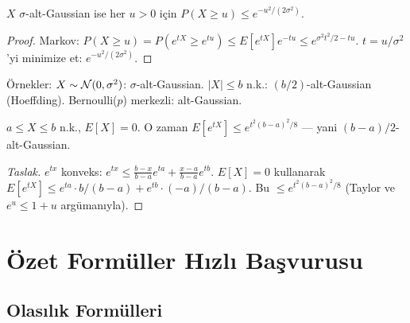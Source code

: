 \begin{teorem}\label{thm:alt_gaussian_kuyruk}
$X$ $\sigma$-alt-Gaussian ise her $u>0$ için $P(X\geq u)\leq e^{-u^2/(2\sigma^2)}$.
\end{teorem}
\begin{proof}
Markov: $P(X\geq u)=P(e^{tX}\geq e^{tu})\leq E[e^{tX}]e^{-tu}\leq e^{\sigma^2t^2/2-tu}$. $t=u/\sigma^2$'yi minimize et: $e^{-u^2/(2\sigma^2)}$.
\end{proof}

\noindent Örnekler: $X\sim\mathcal{N}(0,\sigma^2)$: $\sigma$-alt-Gaussian. $|X|\leq b$ n.k.: $(b/2)$-alt-Gaussian (Hoeffding). Bernoulli($p$) merkezli: alt-Gaussian.

\begin{teorem}\label{thm:hoeffding_lemma}
$a\leq X\leq b$ n.k., $E[X]=0$. O zaman $E[e^{tX}]\leq e^{t^2(b-a)^2/8}$ --- yani $(b-a)/2$-alt-Gaussian.
\end{teorem}
\begin{proof}[Taslak]
$e^{tx}$ konveks: $e^{tx}\leq \frac{b-x}{b-a}e^{ta}+\frac{x-a}{b-a}e^{tb}$.
$E[X]=0$ kullanarak $E[e^{tX}]\leq e^{ta}\cdot b/(b-a)+e^{tb}\cdot(-a)/(b-a)$. Bu $\leq e^{t^2(b-a)^2/8}$ (Taylor ve $e^u\leq1+u$ argümanıyla).
\end{proof}

\section{Özet Formüller Hızlı Başvurusu}
\label{app:hizli_formul}

\subsection{Olasılık Formülleri}

